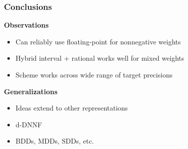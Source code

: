 \documentclass[t,pdf]{beamer}
\begin{document}
\begin{frame}
  \frametitle{Conclusions}

  \bigskip
  
\textbf{Observations}

\medskip

  \begin{itemize}
  \item Can reliably use floating-point for nonnegative weights
  \item Hybrid interval + rational works well for mixed weights
  \item Scheme works across wide range of target precisions
  \end{itemize}

  \bigskip
  
\textbf{Generalizations}  

  \begin{itemize}
  \item Ideas extend to other representations
  \item d-DNNF
  \item BDDs, MDDs, SDDs, etc.
  \end{itemize}

\end{frame}
\end{document}
